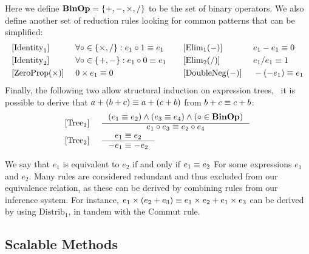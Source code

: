 Here we define $\mathbf{BinOp} = \{ +, -, \times, / \}$ to be the set of binary
operators.  We also define another set of reduction rules looking for common
patterns that can be simplified:
\begin{equation}
    \begin{aligned}{}
        & [\mathrm{Identity}_1] &~&
            \forall \circ \in \{ \times, / \}:
            e_1 \circ 1 \equiv e_1
            & \quad
        & [\mathrm{Elim}_1 (-)] &~&
            e_1 - e_1 \equiv 0
            \\
        & [\mathrm{Identity}_2] &~&
            \forall \circ \in \{ +, - \}:
            e_1 \circ 0 \equiv e_1
            & \quad
        & [\mathrm{Elim}_2 (/)] &~&
            e_1 / e_1 \equiv 1
            \\
        & [\mathrm{ZeroProp} (\times)] &~&
            0 \times e_1 \equiv 0
            & \quad
        & [\mathrm{DoubleNeg} (-)] &~&
            -(-e_1) \equiv e_1
            \\
    \end{aligned}
    \label{so:eq:common_reduction}
\end{equation}
Finally, the following two allow structural induction on expression trees,
\eg~it is possible to derive that $a + (b + c) \equiv a + (c + b)$ from $b + c
\equiv c + b$:
\begin{equation}
    \begin{aligned}
        & [\mathrm{Tree}_1] &~&
        \inference{%
            \left( e_1 \eqrel e_2 \right) \wedge
            \left( e_3 \eqrel e_4 \right) \wedge
            \left( \circ \in \binopset \right)
        }{%
            e_1 \circ e_3 \eqrel e_2 \circ e_4
        } \\
        & [\mathrm{Tree}_2] &~&
        \inference{%
            e_1 \eqrel e_2
        }{%
            -e_1 \eqrel -e_2
        }
    \end{aligned}
    \label{so:eq:equivalence_tree}
\end{equation}

We say that $e_1$ is equivalent to $e_2$ if and only if $e_1 \equiv e_2$ For
some expressions $e_1$ and $e_2$.  Many rules are considered redundant and thus
excluded from our equivalence relation, as these can be derived by combining
rules from our inference system.  For instance, $e_1 \times (e_2 + e_3) \equiv
e_1 \times e_2 + e_1 \times e_3$ can be derived by using $\mathrm{Distrib}_1$,
in tandem with the $\mathrm{Commut}$ rule.


\subsection{Scalable Methods}

